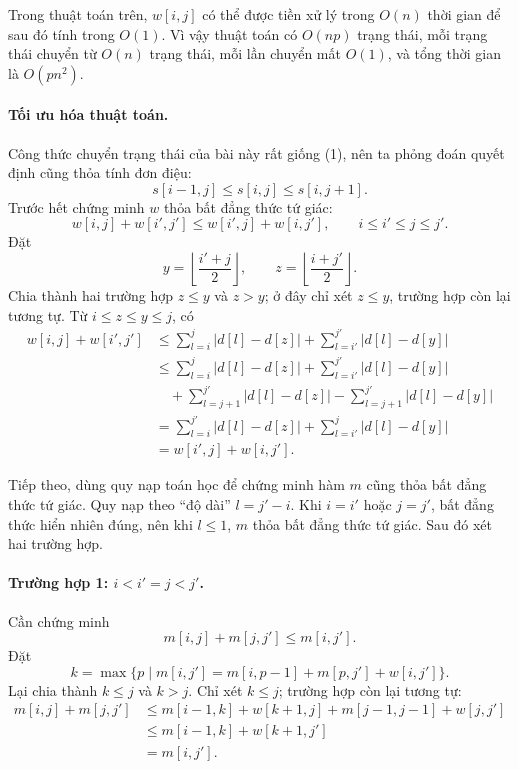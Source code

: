 \documentclass[11pt]{article}
\begin{document}
Trong thuật toán trên, \(w[i,j]\) có thể được tiền xử lý trong \(O(n)\) thời
gian để sau đó tính trong \(O(1)\). Vì vậy thuật toán có \(O(np)\) trạng
thái, mỗi trạng thái chuyển từ \(O(n)\) trạng thái, mỗi lần chuyển mất
\(O(1)\), và tổng thời gian là \(O(pn^2)\).

\paragraph{Tối ưu hóa thuật toán.}
Công thức chuyển trạng thái của bài này rất giống (1), nên ta phỏng đoán
quyết định cũng thỏa tính đơn điệu:
\[
  s[i-1,j]\le s[i,j]\le s[i,j+1].
\]
Trước hết chứng minh \(w\) thỏa bất đẳng thức tứ giác:
\[
  w[i,j]+w[i',j']\le w[i',j]+w[i,j'],
  \qquad i\le i'\le j\le j'.
\]
Đặt
\[
  y=\left\lfloor\frac{i'+j}{2}\right\rfloor,\qquad
  z=\left\lfloor\frac{i+j'}{2}\right\rfloor.
\]
Chia thành hai trường hợp \(z\le y\) và \(z>y\); ở đây chỉ xét \(z\le y\),
trường hợp còn lại tương tự. Từ \(i\le z\le y\le j\), có
\[
\begin{aligned}
w[i,j]+w[i',j']
&\le \sum_{l=i}^{j}|d[l]-d[z]|
   +\sum_{l=i'}^{j'}|d[l]-d[y]|\\
&\le \sum_{l=i}^{j}|d[l]-d[z]|
   +\sum_{l=i'}^{j'}|d[l]-d[y]|\\
&\quad +\sum_{l=j+1}^{j'}|d[l]-d[z]|
   -\sum_{l=j+1}^{j'}|d[l]-d[y]|\\
&=\sum_{l=i}^{j'}|d[l]-d[z]|
  +\sum_{l=i'}^{j}|d[l]-d[y]|\\
&=w[i',j]+w[i,j'].
\end{aligned}
\]

Tiếp theo, dùng quy nạp toán học để chứng minh hàm \(m\) cũng thỏa bất đẳng
thức tứ giác. Quy nạp theo ``độ dài'' \(l=j'-i\). Khi \(i=i'\) hoặc \(j=j'\),
bất đẳng thức hiển nhiên đúng, nên khi \(l\le1\), \(m\) thỏa bất đẳng thức tứ
giác. Sau đó xét hai trường hợp.

\paragraph{Trường hợp 1: \(i<i'=j<j'\).}
Cần chứng minh
\[
  m[i,j]+m[j,j']\le m[i,j'].
\]
Đặt
\[
  k=\max\{p\mid m[i,j']=m[i,p-1]+m[p,j']+w[i,j']\}.
\]
Lại chia thành \(k\le j\) và \(k>j\). Chỉ xét \(k\le j\); trường hợp còn lại
tương tự:
\[
\begin{aligned}
m[i,j]+m[j,j']
&\le m[i-1,k]+w[k+1,j]+m[j-1,j-1]+w[j,j']\\
&\le m[i-1,k]+w[k+1,j']\\
&=m[i,j'].
\end{aligned}
\]
\end{document}
